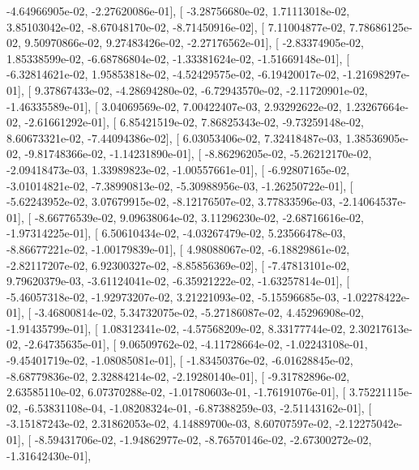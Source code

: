 \documentclass{article}
\begin{document}
         -4.64966905e-02,  -2.27620086e-01],
       [ -3.28756680e-02,   1.71113018e-02,   3.85103042e-02,
         -8.67048170e-02,  -8.71450916e-02],
       [  7.11004877e-02,   7.78686125e-02,   9.50970866e-02,
          9.27483426e-02,  -2.27176562e-01],
       [ -2.83374905e-02,   1.85338599e-02,  -6.68786804e-02,
         -1.33381624e-02,  -1.51669148e-01],
       [ -6.32814621e-02,   1.95853818e-02,  -4.52429575e-02,
         -6.19420017e-02,  -1.21698297e-01],
       [  9.37867433e-02,  -4.28694280e-02,  -6.72943570e-02,
         -2.11720901e-02,  -1.46335589e-01],
       [  3.04069569e-02,   7.00422407e-03,   2.93292622e-02,
          1.23267664e-02,  -2.61661292e-01],
       [  6.85421519e-02,   7.86825343e-02,  -9.73259148e-02,
          8.60673321e-02,  -7.44094386e-02],
       [  6.03053406e-02,   7.32418487e-03,   1.38536905e-02,
         -9.81748366e-02,  -1.14231890e-01],
       [ -8.86296205e-02,  -5.26212170e-02,  -2.09418473e-03,
          1.33989823e-02,  -1.00557661e-01],
       [ -6.92807165e-02,  -3.01014821e-02,  -7.38990813e-02,
         -5.30988956e-03,  -1.26250722e-01],
       [ -5.62243952e-02,   3.07679915e-02,  -8.12176507e-02,
          3.77833596e-03,  -2.14064537e-01],
       [ -8.66776539e-02,   9.09638064e-02,   3.11296230e-02,
         -2.68716616e-02,  -1.97314225e-01],
       [  6.50610434e-02,  -4.03267479e-02,   5.23566478e-03,
         -8.86677221e-02,  -1.00179839e-01],
       [  4.98088067e-02,  -6.18829861e-02,  -2.82117207e-02,
          6.92300327e-02,  -8.85856369e-02],
       [ -7.47813101e-02,   9.79620379e-03,  -3.61124041e-02,
         -6.35921222e-02,  -1.63257814e-01],
       [ -5.46057318e-02,  -1.92973207e-02,   3.21221093e-02,
         -5.15596685e-03,  -1.02278422e-01],
       [ -3.46800814e-02,   5.34732075e-02,  -5.27186087e-02,
          4.45296908e-02,  -1.91435799e-01],
       [  1.08312341e-02,  -4.57568209e-02,   8.33177744e-02,
          2.30217613e-02,  -2.64735635e-01],
       [  9.06509762e-02,  -4.11728664e-02,  -1.02243108e-01,
         -9.45401719e-02,  -1.08085081e-01],
       [ -1.83450376e-02,  -6.01628845e-02,  -8.68779836e-02,
          2.32884214e-02,  -2.19280140e-01],
       [ -9.31782896e-02,   2.63585110e-02,   6.07370288e-02,
         -1.01780603e-01,  -1.76191076e-01],
       [  3.75221115e-02,  -6.53831108e-04,  -1.08208324e-01,
         -6.87388259e-03,  -2.51143162e-01],
       [ -3.15187243e-02,   2.31862053e-02,   4.14889700e-03,
          8.60707597e-02,  -2.12275042e-01],
       [ -8.59431706e-02,  -1.94862977e-02,  -8.76570146e-02,
         -2.67300272e-02,  -1.31642430e-01],
\end{document}
